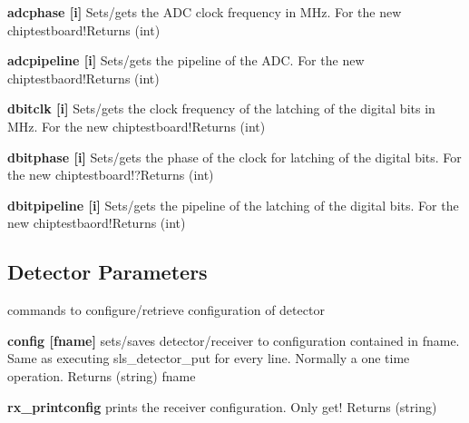 \begin{DoxyItemize}
\item {\bfseries adcphase \mbox{[}i\mbox{]}} Sets/gets the ADC clock frequency in MHz. For the new chiptestboard!{\ttfamily Returns} {\ttfamily }(int)
\end{DoxyItemize}


\begin{DoxyItemize}
\item {\bfseries adcpipeline \mbox{[}i\mbox{]}} Sets/gets the pipeline of the ADC. For the new chiptestbaord!{\ttfamily Returns} {\ttfamily }(int)
\end{DoxyItemize}


\begin{DoxyItemize}
\item {\bfseries dbitclk \mbox{[}i\mbox{]}} Sets/gets the clock frequency of the latching of the digital bits in MHz. For the new chiptestboard!{\ttfamily Returns} {\ttfamily }(int)
\end{DoxyItemize}


\begin{DoxyItemize}
\item {\bfseries dbitphase \mbox{[}i\mbox{]}} Sets/gets the phase of the clock for latching of the digital bits. For the new chiptestboard!?{\ttfamily Returns} {\ttfamily }(int)
\end{DoxyItemize}


\begin{DoxyItemize}
\item {\bfseries dbitpipeline \mbox{[}i\mbox{]}} Sets/gets the pipeline of the latching of the digital bits. For the new chiptestbaord!{\ttfamily Returns} {\ttfamily }(int)
\end{DoxyItemize}\hypertarget{config_configsettings}{}\subsection{Detector Parameters}\label{config_configsettings}
commands to configure/retrieve configuration of detector


\begin{DoxyItemize}
\item {\bfseries config \mbox{[}fname\mbox{]}} sets/saves detector/receiver to configuration contained in fname. Same as executing sls\_\-detector\_\-put for every line. Normally a one time operation. {\ttfamily Returns} {\ttfamily }(string) fname
\end{DoxyItemize}


\begin{DoxyItemize}
\item {\bfseries rx\_\-printconfig} prints the receiver configuration. Only get! {\ttfamily Returns} {\ttfamily }(string)
\end{DoxyItemize}


